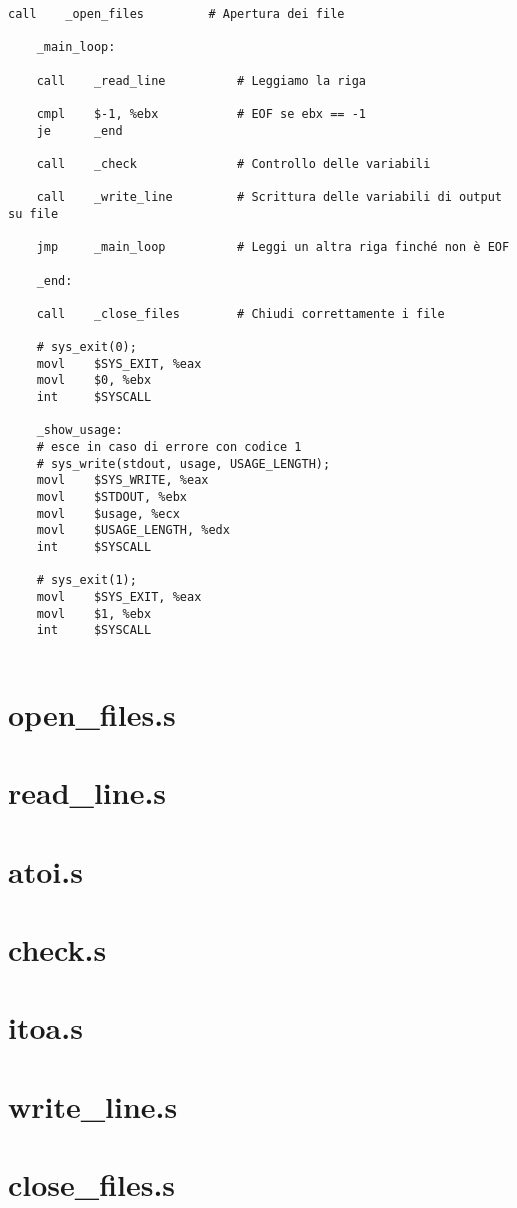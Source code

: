 \documentclass[a4paper,11pt]{article}
\begin{document}
\begin{lstlisting}[language=MyAssembler, style=MyAsm]
	call    _open_files         # Apertura dei file
	
	_main_loop:
	
	call    _read_line          # Leggiamo la riga
	
	cmpl    $-1, %ebx           # EOF se ebx == -1
	je      _end
	
	call    _check              # Controllo delle variabili
	
	call    _write_line         # Scrittura delle variabili di output su file
	
	jmp     _main_loop          # Leggi un altra riga finché non è EOF
	
	_end:
	
	call    _close_files        # Chiudi correttamente i file
	
	# sys_exit(0);
	movl    $SYS_EXIT, %eax
	movl    $0, %ebx
	int     $SYSCALL
	
	_show_usage:
	# esce in caso di errore con codice 1
	# sys_write(stdout, usage, USAGE_LENGTH);
	movl    $SYS_WRITE, %eax
	movl    $STDOUT, %ebx
	movl    $usage, %ecx
	movl    $USAGE_LENGTH, %edx
	int     $SYSCALL
	
	# sys_exit(1);
	movl    $SYS_EXIT, %eax
	movl    $1, %ebx
	int     $SYSCALL
	
	\end{lstlisting}
	
	\section{open\_files.s}
	
	
	\section{read\_line.s}
	
	
	\section{atoi.s}
	
	
	\section{check.s}
	
	
	\section{itoa.s}
	
	
	\section{write\_line.s}
	
	
	\section{close\_files.s}
	
\end{document}
